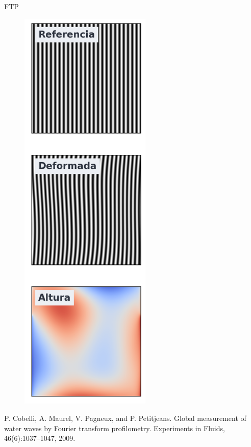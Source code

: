 \documentclass[aspectratio=169]{beamer}
\begin{document}
\begin{frame}{FTP}
\begin{minipage}{0.29\textwidth}
\begin{figure}
	    \includegraphics[width=0.56\textwidth]{figs/synthetic_ftp.png}
	  \end{figure}
	\end{minipage}
	\hfill
	\tiny P. Cobelli, A. Maurel, V. Pagneux, and P. Petitjeans. Global measurement of water waves by Fourier transform profilometry.  Experiments in Fluids, 46(6):1037–1047, 2009.
\end{frame}
\end{document}
